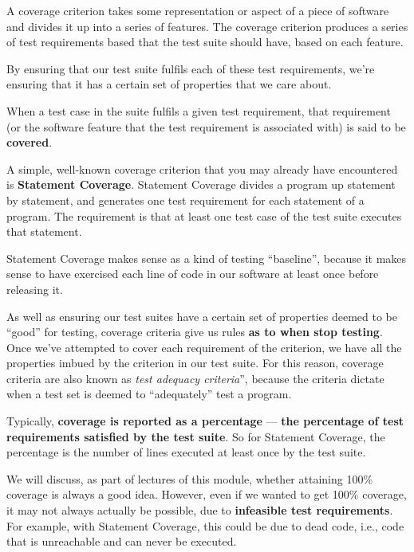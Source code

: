 
A coverage criterion takes some representation or aspect of a piece of software
and divides it up into a series of features. The coverage criterion produces a
series of test requirements based that the test suite should have, based on each
feature. 

By ensuring that our test suite fulfils each of these test requirements, we're
ensuring that it has a certain set of properties that we care about. 


When a test case in the suite fulfils a given test requirement, that requirement
(or the software feature that the test requirement is associated with) is said
to be {\bf covered}. 


A simple, well-known coverage criterion that you may already have encountered is
{\bf Statement Coverage}. Statement Coverage divides a program up statement by
statement, and generates one test requirement for each statement of a program.
The requirement is that at least one test case of the test suite executes that
statement. 

Statement Coverage makes sense as a kind of testing ``baseline'', because it
makes sense to have exercised each line of code in our software at least once
before releasing it. 

As well as ensuring our test suites have a certain set of properties deemed to
be ``good'' for testing, coverage criteria give us rules {\bf as to when stop
testing}. Once we've attempted to cover each requirement of the criterion, we
have all the properties imbued by the criterion in our test suite. For this
reason, coverage criteria are also known as {\it test adequacy criteria}'',
because the criteria dictate when a test set is deemed to ``adequately'' test a
program. 


Typically, {\bf coverage is reported as a percentage} --- {\bf the percentage of
test requirements satisfied by the test suite}. So for Statement Coverage, the
percentage is the number of lines executed at least once by the test suite.

We will discuss, as part of lectures of this module, whether attaining 100\%
coverage is always a good idea. However, even if we wanted to get 100\%
coverage, it may not always actually be possible, due to {\bf infeasible test
requirements}. For example, with Statement Coverage, this could be due to dead
code, i.e., code that is unreachable and can never be executed. 

